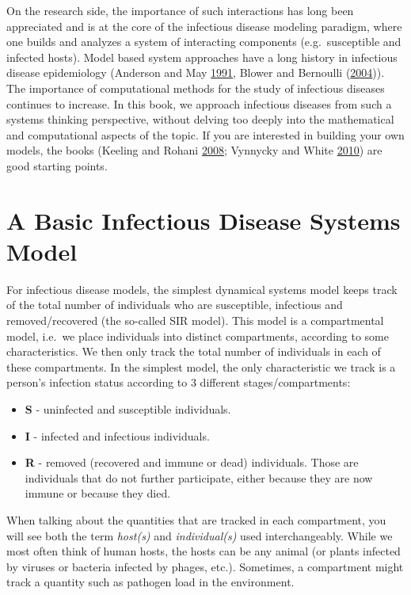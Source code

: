 \documentclass[]{book}
\providecommand{\tightlist}{%
  \setlength{\itemsep}{0pt}\setlength{\parskip}{0pt}}
\theoremstyle{definition}
\theoremstyle{definition}
\theoremstyle{definition}
\theoremstyle{remark}
\begin{document}
On the research side, the importance of such interactions has long been
appreciated and is at the core of the infectious disease modeling
paradigm, where one builds and analyzes a system of interacting
components (e.g.~susceptible and infected hosts). Model based system
approaches have a long history in infectious disease epidemiology
(Anderson and May \protect\hyperlink{ref-anderson91}{1991}, Blower and
Bernoulli (\protect\hyperlink{ref-blower04}{2004})). The importance of
computational methods for the study of infectious diseases continues to
increase. In this book, we approach infectious diseases from such a
systems thinking perspective, without delving too deeply into the
mathematical and computational aspects of the topic. If you are
interested in building your own models, the books (Keeling and Rohani
\protect\hyperlink{ref-keeling08}{2008}; Vynnycky and White
\protect\hyperlink{ref-vynnycky10}{2010}) are good starting points.

\section{A Basic Infectious Disease Systems
Model}\label{a-basic-infectious-disease-systems-model}

For infectious disease models, the simplest dynamical systems model
keeps track of the total number of individuals who are susceptible,
infectious and removed/recovered (the so-called SIR model). This model
is a compartmental model, i.e.~we place individuals into distinct
compartments, according to some characteristics. We then only track the
total number of individuals in each of these compartments. In the
simplest model, the only characteristic we track is a person's infection
status according to 3 different stages/compartments:

\begin{itemize}
\tightlist
\item
  \textbf{S} - uninfected and susceptible individuals.
\item
  \textbf{I} - infected and infectious individuals.
\item
  \textbf{R} - removed (recovered and immune or dead) individuals. Those
  are individuals that do not further participate, either because they
  are now immune or because they died.
\end{itemize}

When talking about the quantities that are tracked in each compartment,
you will see both the term \emph{host(s)} and \emph{individual(s)} used
interchangeably. While we most often think of human hosts, the hosts can
be any animal (or plants infected by viruses or bacteria infected by
phages, etc.). Sometimes, a compartment might track a quantity such as
pathogen load in the environment.
\end{document}
